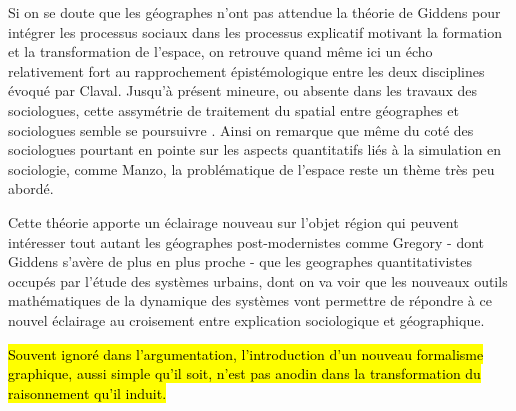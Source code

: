 
Si on se doute que les géographes n'ont pas attendue la théorie de Giddens pour intégrer les processus sociaux dans les processus explicatif motivant la formation et la transformation de l'espace, on retrouve quand même ici un écho relativement fort au rapprochement épistémologique entre les deux disciplines évoqué par Claval. Jusqu'à présent mineure, ou absente dans les travaux des sociologues, cette assymétrie de traitement du spatial entre géographes et sociologues semble se poursuivre \autocite{Rhein2003}. Ainsi on remarque que même du coté des sociologues pourtant en pointe sur les aspects quantitatifs liés à la simulation en sociologie, comme Manzo, la problématique de l'espace reste un thème très peu abordé.


Cette théorie apporte un éclairage nouveau sur l'objet région qui peuvent intéresser tout autant les géographes post-modernistes comme Gregory - dont Giddens s'avère de plus en plus proche - que les geographes quantitativistes occupés par l'étude des systèmes urbains, dont on va voir que les nouveaux outils mathématiques de la dynamique des systèmes vont permettre de répondre à ce nouvel éclairage au croisement entre explication sociologique et géographique.


\hl{Souvent ignoré dans l'argumentation, l'introduction d'un nouveau formalisme graphique, aussi simple qu'il soit, n'est pas anodin dans la transformation du raisonnement qu'il induit.}

